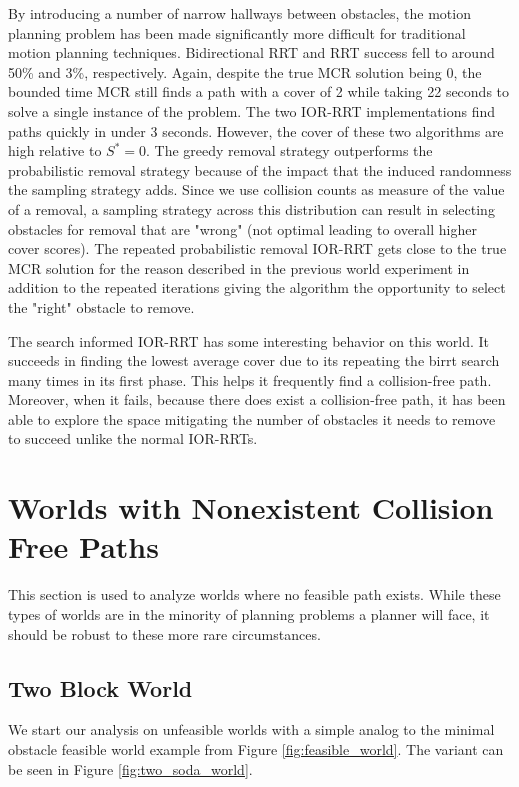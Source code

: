 By introducing a number of narrow hallways between obstacles, the motion planning problem has been made significantly more difficult for traditional motion planning techniques. Bidirectional RRT and RRT success fell to around 50\% and 3\%, respectively. Again, despite the true MCR solution being 0, the bounded time MCR still finds a path with a cover of 2 while taking 22 seconds to solve a single instance of the problem. The two IOR-RRT implementations find paths quickly in under 3 seconds. However, the cover of these two algorithms are high relative to $S^{*} = 0$. The greedy removal strategy outperforms the probabilistic removal strategy because of the impact that the induced randomness the sampling strategy adds. Since we use collision counts as measure of the value of a removal, a sampling strategy across this distribution can result in selecting obstacles for removal that are "wrong" (not optimal leading to overall higher cover scores). The repeated probabilistic removal IOR-RRT gets close to the true MCR solution for the reason described in the previous world experiment in addition to the repeated iterations giving the algorithm the opportunity to select the "right" obstacle to remove. 

The search informed IOR-RRT has some interesting behavior on this world. It succeeds in finding the lowest average cover due to its repeating the birrt search many times in its first phase. This helps it frequently find a collision-free path. Moreover, when it fails, because there does exist a collision-free path, it has been able to explore the space mitigating the number of obstacles it needs to remove to succeed unlike the normal IOR-RRTs.


\section{Worlds with Nonexistent Collision Free Paths}\label{results:unfeasible}
This section is used to analyze worlds where no feasible path exists. While these types of worlds are in the minority of planning problems a planner will face, it should be robust to these more rare circumstances. 

\subsection{Two Block World}
We start our analysis on unfeasible worlds with a simple analog to the minimal obstacle feasible world example from Figure \ref{fig:feasible_world}. The variant can be seen in Figure \ref{fig:two_soda_world}.

